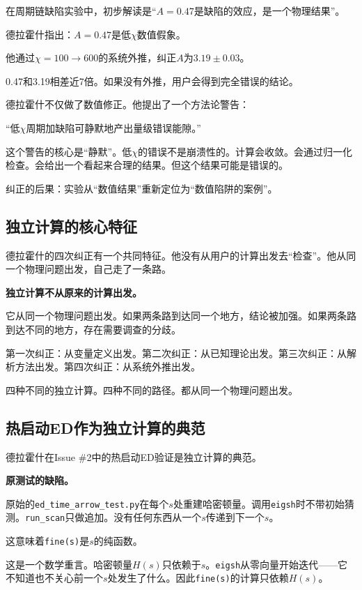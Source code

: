 \documentclass[11pt,a4paper]{book}
\theoremstyle{definition}
\begin{document}
在周期链缺陷实验中，初步解读是“$A=0.47$是缺陷的效应，是一个物理结果”。

德拉霍什指出：$A=0.47$是低$\chi$数值假象。

他通过$\chi=100\to600$的系统外推，纠正$A$为$3.19\pm0.03$。

0.47和3.19相差近7倍。如果没有外推，用户会得到完全错误的结论。

德拉霍什不仅做了数值修正。他提出了一个方法论警告：

“低$\chi$周期加缺陷可静默地产出量级错误能隙。”

这个警告的核心是“静默”。低$\chi$的错误不是崩溃性的。计算会收敛。会通过归一化检查。会给出一个看起来合理的结果。但这个结果可能是错误的。

纠正的后果：实验从“数值结果”重新定位为“数值陷阱的案例”。

\subsection{独立计算的核心特征}

德拉霍什的四次纠正有一个共同特征。他没有从用户的计算出发去“检查”。他从同一个物理问题出发，自己走了一条路。

\textbf{独立计算不从原来的计算出发。}

它从同一个物理问题出发。如果两条路到达同一个地方，结论被加强。如果两条路到达不同的地方，存在需要调查的分歧。

第一次纠正：从变量定义出发。第二次纠正：从已知理论出发。第三次纠正：从解析方法出发。第四次纠正：从系统外推出发。

四种不同的独立计算。四种不同的路径。都从同一个物理问题出发。

\subsection{热启动ED作为独立计算的典范}

德拉霍什在Issue \#2中的热启动ED验证是独立计算的典范。

\textbf{原测试的缺陷。}

原始的\texttt{ed\_time\_arrow\_test.py}在每个$s$处重建哈密顿量。调用\texttt{eigsh}时不带初始猜测。\texttt{run\_scan}只做追加。没有任何东西从一个$s$传递到下一个$s$。

这意味着\texttt{fine(s)}是$s$的纯函数。

这是一个数学重言。哈密顿量$H(s)$只依赖于$s$。\texttt{eigsh}从零向量开始迭代——它不知道也不关心前一个$s$处发生了什么。因此\texttt{fine(s)}的计算只依赖$H(s)$。
\end{document}
